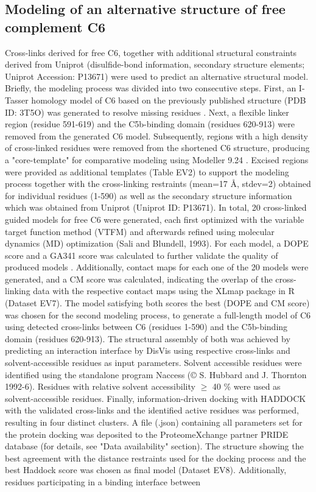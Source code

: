 \subsection*{Modeling of an alternative structure of free complement C6} Cross-links derived for free C6, together with additional structural constraints derived from Uniprot (disulfide-bond information, secondary structure elements; Uniprot Accession: P13671) were used to predict an alternative structural model. Briefly, the modeling process was divided into two consecutive steps. First, an I-Tasser homology model of C6 based on the previously published structure (PDB ID: 3T5O) was generated to resolve missing residues \cite{Yang_2015}. Next, a flexible linker region (residue 591-619) and the C5b-binding domain (residues 620-913) were removed from the generated C6 model. Subsequently, regions with a high density of cross-linked residues were removed from the shortened C6 structure, producing a "core-template" for comparative modeling using Modeller 9.24 \cite{Webb_2016}. Excised regions were provided as additional templates (Table EV2) to support the modeling process together with the cross-linking restraints (mean=17 Å, stdev=2) obtained for individual residues (1-590) as well as the secondary structure information which was obtained from Uniprot (Uniprot ID: P13671). In total, 20 cross-linked guided models for free C6 were generated, each first optimized with the variable target function method (VTFM) and afterwards refined using molecular dynamics (MD) optimization (Sali and Blundell, 1993). For each model, a DOPE score and a GA341 score was calculated to further validate the quality of produced models \cite{John_2003, Melo_2002, Shen_2006}. Additionally, contact maps for each one of the 20 models were generated, and a CM score \cite{Schweppe_2016} was calculated, indicating the overlap of the cross-linking data with the respective contact maps using the XLmap package in R \cite{Schweppe_2016} (Dataset EV7). The model satisfying both scores the best (DOPE and CM score) was chosen for the second modeling process, to generate a full-length model of C6 using detected cross-links between C6 (residues 1-590) and the C5b-binding domain (residues 620-913). The structural assembly of both was achieved by predicting an interaction interface by DisVis \cite{van_Zundert_2015} using respective cross-links and solvent-accessible residues as input parameters. Solvent accessible residues were identified using the standalone program Naccess (© S. Hubbard and J. Thornton 1992-6). Residues with relative solvent accessibility $\geq$ 40 \% were used as solvent-accessible residues. Finally, information-driven docking with HADDOCK \cite{Karaca_2011, van_Zundert_2016} with the validated cross-links and the identified active residues was performed, resulting in four distinct clusters. A file (.json) containing all parameters set for the protein docking was deposited to the ProteomeXchange partner PRIDE database (for details, see "Data availability" section). The structure showing the best agreement with the distance restraints used for the docking process and the best Haddock score was chosen as final model (Dataset EV8). Additionally, residues participating in a binding interface between 